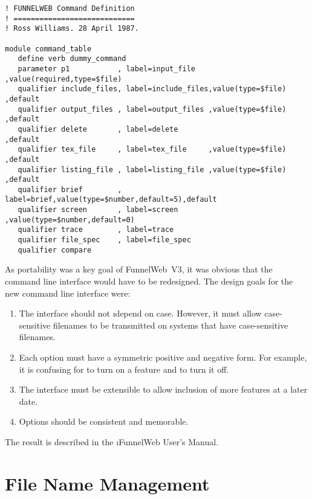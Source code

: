 \beginsmall
\begin{verbatim}
! FUNNELWEB Command Definition
! ============================
! Ross Williams. 28 April 1987.

module command_table
   define verb dummy_command
   parameter p1           , label=input_file   ,value(required,type=$file)
   qualifier include_files, label=include_files,value(type=$file) ,default
   qualifier output_files , label=output_files ,value(type=$file) ,default
   qualifier delete       , label=delete                          ,default
   qualifier tex_file     , label=tex_file     ,value(type=$file) ,default
   qualifier listing_file , label=listing_file ,value(type=$file) ,default
   qualifier brief        , label=brief,value(type=$number,default=5),default
   qualifier screen       , label=screen       ,value(type=$number,default=0)
   qualifier trace        , label=trace
   qualifier file_spec    , label=file_spec
   qualifier compare
\end{verbatim}
\endsmall

As portability was a key goal of FunnelWeb~V3, it was obvious that the
command line interface would have to be redesigned. The design goals for the
new command line interface were:

\begin{enumerate}

\item The interface should not \i{depend} on case. However, it must allow
      case-sensitive filenames to be transmitted on systems that have
      case-sensitive filenames.

\item Each option must have a symmetric positive and negative form. For
      example, it is confusing for  to turn on a feature and 
      to turn it off.

\item The interface must be extensible to allow inclusion of more features
      at a later date.

\item Options should be consistent and memorable.

\end{enumerate}

The result is described in the \i{FunnelWeb User's Manual}.

\section{File Name Management}

